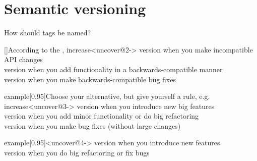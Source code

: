 \documentclass[usenames,svgnames,14pt]{beamer}
\begin{document}
\section{Semantic versioning}
\begin{frame}{How should tags be named? \hfill{}}
    \vspace{-2mm}
    \PrepareURLsymbol[PB]
    \begin{varblock*}{}[\textwidth]{According to the \color{PP}, increase}<uncover@2->
        \small
         version  when you make incompatible API changes\\
         version  when you add functionality in a backwards-compatible manner\\
         version  when you make backwards-compatible bug fixes
    \end{varblock*}
    \begin{varblock*}{example}[0.95\textwidth]{Choose your alternative, but give yourself a rule, e.g. increase}<uncover@3->
        \small
         version  when you introduce new big features\\
         version  when you add minor functionality or do big refactoring\\
         version  when you make bug fixes (without large changes)
    \end{varblock*}
    \vspace{-2mm}
    \begin{varblock*}{example}[0.95\textwidth]{}<uncover@4->
        \small
         version  when you introduce new features\\
         version  when you do big refactoring or fix bugs
    \end{varblock*}
    \begin{center}
    \end{center}
\end{frame}
\end{document}
